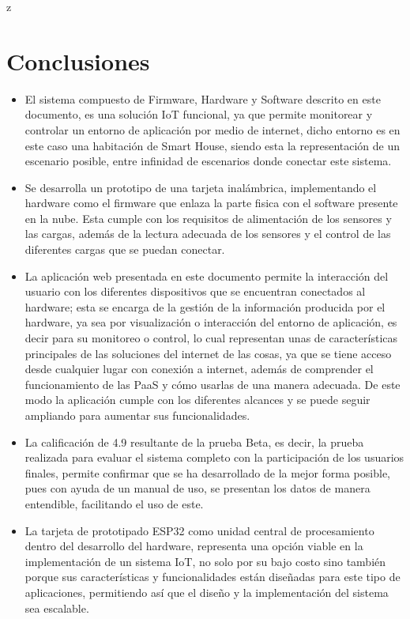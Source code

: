 z\chapter{Conclusiones}

\begin{itemize}
	\item El sistema compuesto de Firmware, Hardware y Software descrito en este documento, es una solución IoT funcional, ya que permite monitorear y controlar un entorno de aplicación por medio de internet, dicho entorno es en este caso una habitación de Smart House, siendo esta la representación de un escenario posible, entre infinidad de escenarios donde conectar este sistema.
	
	\item Se desarrolla un prototipo de una tarjeta inalámbrica, implementando el hardware como el firmware que enlaza la parte fisica con el software presente en la nube. Esta cumple con los requisitos de alimentación de los sensores y las cargas, además de la lectura adecuada de los sensores y el control de las diferentes cargas que se puedan conectar.
	
	\item La aplicación web presentada en este documento permite la interacción del usuario con los diferentes dispositivos que se encuentran conectados al hardware; esta se encarga de la gestión de la información producida por el hardware, ya sea por visualización o interacción del entorno de aplicación, es decir para su monitoreo o control, lo cual representan unas de características principales de las soluciones del internet de las cosas, ya que se tiene acceso desde cualquier lugar con conexión a internet, además de comprender el funcionamiento de las PaaS y cómo usarlas de una manera adecuada. De este modo la aplicación cumple con los diferentes alcances y se puede seguir ampliando para aumentar sus funcionalidades.
	
	\item La calificación de 4.9 resultante de la prueba Beta, es decir, la prueba realizada para evaluar el sistema completo con la participación de los usuarios finales, permite confirmar que se ha desarrollado de la mejor forma posible, pues con ayuda de un manual de uso, se presentan los datos de manera entendible, facilitando el uso de este.
		
	\item La tarjeta de prototipado ESP32 como unidad central de procesamiento dentro del desarrollo del hardware, representa una opción viable en la implementación de un sistema IoT, no solo por su bajo costo sino también porque sus características y funcionalidades están diseñadas para este tipo de aplicaciones, permitiendo así que el diseño y la implementación del sistema sea escalable.
	

\end{itemize}
